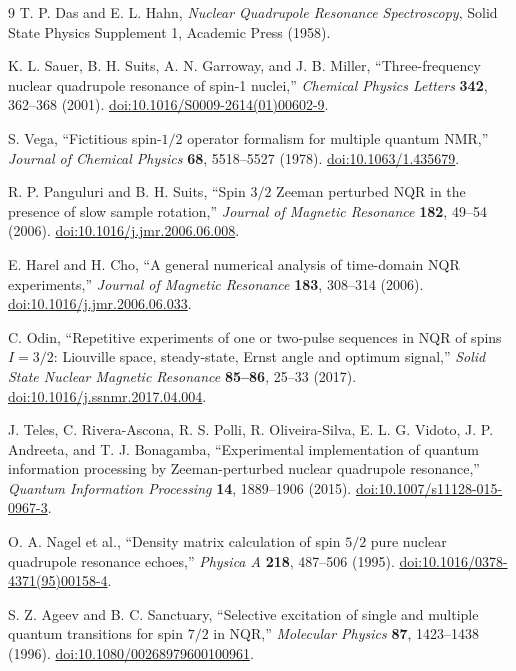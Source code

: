 \documentclass[11pt,letterpaper]{article}
\begin{document}
\begin{thebibliography}{9}
\small
{}
T. P. Das and E. L. Hahn, \textit{Nuclear Quadrupole Resonance Spectroscopy}, Solid State Physics Supplement 1, Academic Press (1958).

K. L. Sauer, B. H. Suits, A. N. Garroway, and J. B. Miller, ``Three-frequency nuclear quadrupole resonance of spin-1 nuclei,'' \textit{Chemical Physics Letters} \textbf{342}, 362--368 (2001). \href{https://doi.org/10.1016/S0009-2614(01)00602-9}{doi:10.1016/S0009-2614(01)00602-9}.

S. Vega, ``Fictitious spin-$1/2$ operator formalism for multiple quantum NMR,'' \textit{Journal of Chemical Physics} \textbf{68}, 5518--5527 (1978). \href{https://doi.org/10.1063/1.435679}{doi:10.1063/1.435679}.

R. P. Panguluri and B. H. Suits, ``Spin $3/2$ Zeeman perturbed NQR in the presence of slow sample rotation,'' \textit{Journal of Magnetic Resonance} \textbf{182}, 49--54 (2006). \href{https://doi.org/10.1016/j.jmr.2006.06.008}{doi:10.1016/j.jmr.2006.06.008}.

E. Harel and H. Cho, ``A general numerical analysis of time-domain NQR experiments,'' \textit{Journal of Magnetic Resonance} \textbf{183}, 308--314 (2006). \href{https://doi.org/10.1016/j.jmr.2006.06.033}{doi:10.1016/j.jmr.2006.06.033}.

C. Odin, ``Repetitive experiments of one or two-pulse sequences in NQR of spins $I=3/2$: Liouville space, steady-state, Ernst angle and optimum signal,'' \textit{Solid State Nuclear Magnetic Resonance} \textbf{85--86}, 25--33 (2017). \href{https://doi.org/10.1016/j.ssnmr.2017.04.004}{doi:10.1016/j.ssnmr.2017.04.004}.

J. Teles, C. Rivera-Ascona, R. S. Polli, R. Oliveira-Silva, E. L. G. Vidoto, J. P. Andreeta, and T. J. Bonagamba, ``Experimental implementation of quantum information processing by Zeeman-perturbed nuclear quadrupole resonance,'' \textit{Quantum Information Processing} \textbf{14}, 1889--1906 (2015). \href{https://doi.org/10.1007/s11128-015-0967-3}{doi:10.1007/s11128-015-0967-3}.

O. A. Nagel et al., ``Density matrix calculation of spin $5/2$ pure nuclear quadrupole resonance echoes,'' \textit{Physica A} \textbf{218}, 487--506 (1995). \href{https://doi.org/10.1016/0378-4371(95)00158-4}{doi:10.1016/0378-4371(95)00158-4}.

S. Z. Ageev and B. C. Sanctuary, ``Selective excitation of single and multiple quantum transitions for spin $7/2$ in NQR,'' \textit{Molecular Physics} \textbf{87}, 1423--1438 (1996). \href{https://doi.org/10.1080/00268979600100961}{doi:10.1080/00268979600100961}.
\end{thebibliography}
\end{document}
